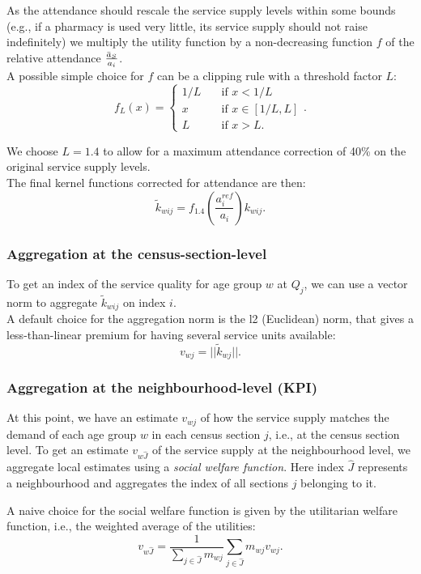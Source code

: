 \documentclass{article}
\begin{document}
As the attendance should rescale the service supply levels within some bounds (e.g., if a pharmacy is used very little, its service supply should not raise indefinitely) we multiply the utility function by a non-decreasing function $f$ of the relative attendance $\frac{\Bar{a}_S}{a_i}$. \\
A possible simple choice for $f$ can be a clipping rule with a threshold factor $L$:
\[
f_L(x) = \left\{\begin{array}{ll}
    1/L \quad &\text{if } x < 1/L \\
    x \quad &\text{if }  x \in [1/L, L] \\
    L \quad &\text{if }  x > L.
    \end{array} \right..
 \] 
    
We choose $L=1.4$ to allow for a maximum attendance correction of 40\% on the original service supply levels. \\
The final kernel functions corrected for attendance are then:
    \[\widetilde{k}_{wij} = f_{1.4}\left(\frac{a_i^{ref}}{a_i}\right)k_{wij}.\]
    
\subsubsection{Aggregation at the census-section-level}
To get an index of the service quality for age group $w$ at $Q_j$, we can use a vector norm to aggregate $\widetilde{k}_{wij}$ on index $i$.\\
A default choice for the aggregation norm is the l2 (Euclidean) norm, that gives a less-than-linear premium for having several service units available:
    \[v_{wj} = ||\widetilde{k}_{wj}||. \] 
\subsubsection{Aggregation at the neighbourhood-level (KPI)}
At this point, we have an estimate $v_{wj}$ of how the service supply matches the demand of each age group $w$ in each census section $j$, i.e., at the census section level. To get an estimate $v_{w\hat{J}}$ of the service supply at the neighbourhood level, we aggregate local estimates using a \textit{social welfare function}. Here index $\hat{J}$ represents a neighbourhood and aggregates the index of all sections $j$ belonging to it.

A naive choice for the social welfare function is given by the utilitarian welfare function, i.e., the weighted average of the utilities:
\[v_{w\hat{J}} = \frac{1}{\sum_{j \in \hat{J}} m_{wj}}\sum_{j \in \hat{J}} m_{wj} v_{wj}.
\]
\end{document}

